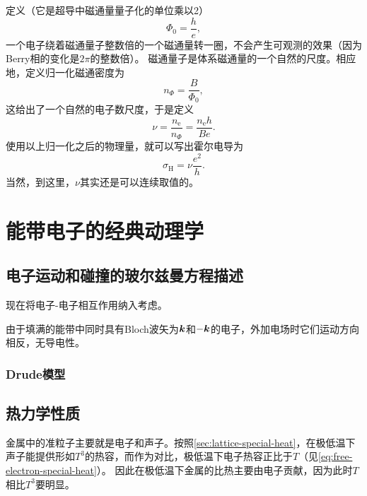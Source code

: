 定义（它是超导中磁通量量子化的单位乘以2）
\begin{equation}
    \Phi_0 = \frac{h}{e},
\end{equation}
一个电子绕着磁通量子整数倍的一个磁通量转一圈，不会产生可观测的效果（因为Berry相的变化是$2\pi$的整数倍）。
磁通量子是体系磁通量的一个自然的尺度。相应地，定义归一化磁通密度为
\begin{equation}
    n_{\Phi} = \frac{B}{\Phi_0},
\end{equation}
这给出了一个自然的电子数尺度，于是定义
\begin{equation}
    \nu = \frac{n_\text{e}}{n_\Phi} = \frac{n_\text{e} h}{B e}.
\end{equation}
使用以上归一化之后的物理量，就可以写出霍尔电导为
\begin{equation}
    \sigma_\text{H} = \nu \frac{e^2}{h}.
    \label{eq:classical-hall-conductivity}
\end{equation}
当然，到这里，$\nu$其实还是可以连续取值的。

\section{能带电子的经典动理学}

\subsection{电子运动和碰撞的玻尔兹曼方程描述}



现在将电子-电子相互作用纳入考虑。

由于填满的能带中同时具有Bloch波矢为$\vb*{k}$和$-\vb*{k}$的电子，外加电场时它们运动方向相反，无导电性。

\subsubsection{Drude模型}

\subsection{热力学性质}


金属中的准粒子主要就是电子和声子。按照\autoref{sec:lattice-special-heat}，在极低温下声子能提供形如$T^3$的热容，而作为对比，极低温下电子热容正比于$T$（见\eqref{eq:free-electron-special-heat}）。
因此在极低温下金属的比热主要由电子贡献，因为此时$T$相比$T^3$要明显。

